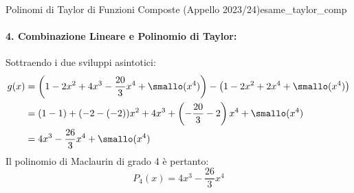 \begin{esempio}{Polinomi di Taylor di Funzioni Composte (Appello 2023/24)}{esame_taylor_comp}
\paragraph{4. Combinazione Lineare e Polinomio di Taylor:}
Sottraendo i due sviluppi asintotici:
\begin{align*}
    g(x) &= \left(1 - 2x^2 + 4x^3 - \frac{20}{3}x^4 + \smallo(x^4)\right) - \left(1 - 2x^2 + 2x^4 + \smallo(x^4)\right) \\
    &= (1 - 1) + (-2 - (-2))x^2 + 4x^3 + \left(-\frac{20}{3} - 2\right)x^4 + \smallo(x^4) \\
    &= 4x^3 - \frac{26}{3}x^4 + \smallo(x^4)
\end{align*}
Il polinomio di Maclaurin di grado 4 è pertanto:
\[
    P_4(x) = 4x^3 - \frac{26}{3}x^4
\]
\end{esempio}

